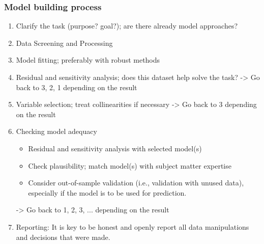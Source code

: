 \subsubsection{Model building process}

\begin{enumerate}
	\tightlist
	\item Clarify the task (purpose? goal?); are there already model approaches?
	\item Data Screening and Processing
	\item Model fitting; preferably with robust methods
	\item Residual and sensitivity analysis; does this dataset help solve the task? -> Go back to 3, 2, 1 depending on the result
	\item Variable selection; treat collinearities if necessary -> Go back to 3 depending on the result
	\item Checking model adequacy
	\begin{itemize}
		\tightlist
		\item Residual and sensitivity analysis with selected model(s)
		\item Check plausibility; match model(s) with subject matter expertise
		\item Consider out-of-sample validation (i.e., validation with unused data), especially if the model is to be used for prediction.
	\end{itemize}
	-> Go back to 1, 2, 3, ... depending on the result
	\item Reporting: It is key to be honest and openly report all data manipulations and decisions that were made.
\end{enumerate}
